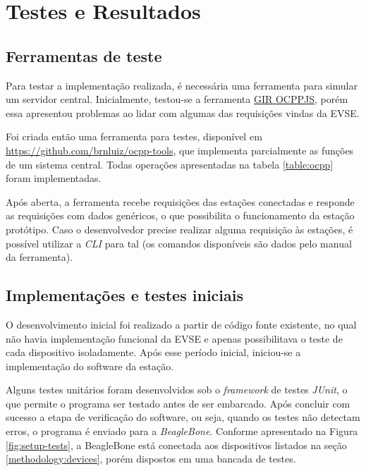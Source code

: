 \chapter{Testes e Resultados}
\label{tests:tests}

  \section{Ferramentas de teste}
  \label{tests:tools}

    Para testar a implementação realizada, é necessária uma ferramenta para simular um servidor central. Inicialmente, testou-se a ferramenta \href{http://www.gir.fr/ocppjs/}{GIR OCPPJS}, porém essa apresentou problemas ao lidar com algumas das requisições vindas da \ac{EVSE}.

    Foi criada então uma ferramenta para testes, disponível em \url{https://github.com/brnluiz/ocpp-tools}, que implementa parcialmente as funções de um sistema central. Todas operações apresentadas na tabela \ref{table:ocpp} foram implementadas.

    Após aberta, a ferramenta recebe requisições das estações conectadas e responde as requisições com dados genéricos, o que possibilita o funcionamento da estação protótipo. Caso o desenvolvedor precise realizar alguma requisição às estações, é possível utilizar a \textit{\ac{CLI}} para tal (os comandos disponíveis são dados pelo manual da ferramenta).

  \section{Implementações e testes iniciais}
  \label{tests:initial}

    O desenvolvimento inicial foi realizado a partir de código fonte existente, no qual não havia implementação funcional da EVSE e  apenas possibilitava o teste de cada dispositivo isoladamente. Após esse período inicial, iniciou-se a implementação do software da estação.

    Alguns testes unitários foram desenvolvidos sob o \textit{framework} de testes \textit{JUnit}, o que permite o programa ser testado antes de ser embarcado. Após concluir com sucesso a etapa de verificação do software, ou seja, quando os testes não detectam erros, o programa é enviado para a \textit{BeagleBone}. Conforme apresentado na Figura \ref{fig:setup-tests}, a BeagleBone está conectada aos dispositivos listados na seção \ref{methodology:devices}, porém dispostos em uma bancada de testes.

